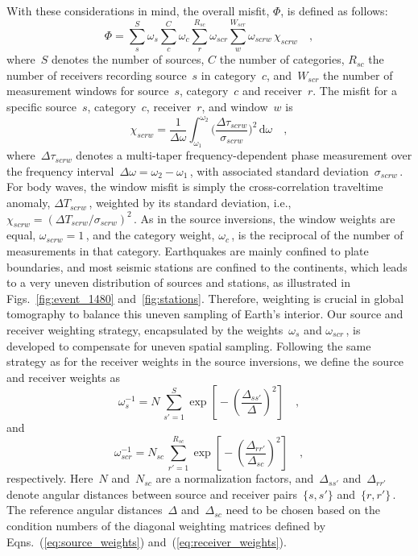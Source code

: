 \documentclass[extra,mreferee]{gji}
\begin{document}
With these considerations in mind,
the overall misfit, $\Phi$, is defined as follows:
\begin{equation}
\label{eq:misfit}
\Phi = \sum_{s}^{S} \omega_s \sum_{c}^{C} \omega_{c} \sum_{r}^{R_{sc}} \omega_{scr} \sum_{w}^{W_{scr}} \omega_{scrw}\, \chi_{scrw}
\quad ,
\end{equation}
where~$S$ denotes the number of sources, $C$ the number of categories,
$R_{sc}$ the number of receivers recording source~$s$ in category~$c$,
and~$W_{scr}$ the number of measurement windows for source~$s$, category~$c$
and receiver~$r$.
The misfit for a specific source~$s$, category~$c$, receiver~$r$, and window~$w$ is
\begin{equation}
  \chi_{scrw} = \frac{1}{\Delta\omega}\int_{\omega_1}^{\omega_2} \Big( \frac {\Delta \tau_{scrw}} {\sigma_{scrw}} \Big)^2\, \mathrm{d}\omega
\quad ,
\end{equation}
where~$\Delta \tau_{scrw}$ denotes a multi-taper frequency-dependent phase measurement over the frequency interval~$\Delta\omega=\omega_2-\omega_1$\,,
with associated standard deviation~$\sigma_{scrw}$\,.
For body waves, the window misfit is simply the cross-correlation traveltime anomaly,
$\Delta T_{scrw}$\,, weighted by its standard deviation, i.e., $\chi_{scrw}=(\Delta T_{scrw}/\sigma_{scrw})^2$\,.
As in the source inversions,
the window weights are equal, $\omega_{scrw}=1$\,,
and the category weight, $\omega_c$\,, is the reciprocal of the number of measurements in that
category.
Earthquakes are mainly confined to plate boundaries,
and most seismic stations are confined to the continents,
which leads to a very uneven distribution of sources and stations,
as illustrated in Figs.~\ref{fig:event_1480} and~\ref{fig:stations}.
Therefore, weighting is crucial in global tomography to balance this uneven sampling
of Earth's interior.
Our source and receiver weighting strategy,
encapsulated by the weights~$\omega_s$ and $\omega_{scr}$\,,
is developed to compensate for uneven spatial sampling.
Following the same strategy as for the receiver weights in the source inversions,
we define the source and receiver weights as
\begin{equation}
\omega_{s}^{-1} = N\,\sum_{s'=1}^{S} \exp\left[\mbox{}-\left(\frac{\Delta_{ss'}}{\Delta}\right)^2\right]
\quad ,
\label{eq:source_weights}
\end{equation}
and
\begin{equation}
\omega_{scr}^{-1} = N_{sc}\,\sum_{r'=1}^{R_{sc}} \exp\left[\mbox{}-\left(\frac{\Delta_{rr'}}{\Delta_{sc}}\right)^2\right]
\quad ,
\label{eq:receiver_weights}
\end{equation}
respectively.
Here~$N$ and~$N_{sc}$ are a normalization factors,
and~$\Delta_{ss'}$ and~$\Delta_{rr'}$ denote angular distances between source and receiver pairs~$\{s,s'\}$ and~$\{r,r'\}$\,.
The reference angular distances~$\Delta$ and~$\Delta_{sc}$ need to be chosen based on the condition 
numbers of the diagonal weighting matrices defined by Eqns.~(\ref{eq:source_weights}) and~(\ref{eq:receiver_weights}).
\end{document}
